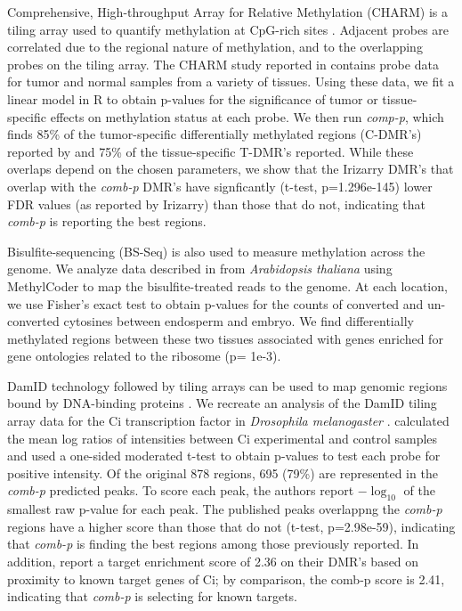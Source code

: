 \documentclass{bioinfo}
\begin{document}
\begin{methods}
Comprehensive, High-throughput Array for Relative Methylation (CHARM)
is a tiling array used to quantify methylation at CpG-rich sites
\citep{Irizarry2008}.  Adjacent probes are correlated
due to the regional nature of methylation, and to the overlapping
probes on the tiling array.  The CHARM study reported in
\cite{Irizarry2009} contains probe data for tumor and normal samples
from a variety of tissues. Using these data, we fit a linear model in R
\citep{R} to
obtain p-values for the significance of tumor or tissue-specific
effects on methylation status at each probe.  We then run
\textit{comp-p}, which finds 85\% of the tumor-specific differentially
methylated regions (C-DMR's) reported by \cite{Irizarry2009} and 75\% of
the tissue-specific T-DMR's reported.  While these overlaps depend on
the chosen parameters, we show that the Irizarry DMR's that overlap
with the \textit{comb-p} DMR's have signficantly (t-test,
p=1.296e-145) lower FDR values (as reported by Irizarry) than those
that do not, indicating that \textit{comb-p} is reporting the best regions.

Bisulfite-sequencing (BS-Seq) is also used to measure methylation across the
genome.  We analyze data described in \cite{Hsieh2009} from {\it Arabidopsis
thaliana} using MethylCoder \citep{Pedersen2011} to map the
bisulfite-treated reads to the genome. At each location,
we use Fisher's exact test to obtain p-values for the counts of
converted and un-converted cytosines between endosperm and embryo. We find
differentially methylated regions between these two tissues associated
with genes enriched for gene ontologies related to the ribosome (p=
1e-3).

DamID technology followed by tiling arrays can be used to map genomic
regions bound by DNA-binding proteins \citep{Steensel2001}.  We
recreate an analysis of the DamID tiling array data for the Ci
transcription factor in {\it Drosophila melanogaster} \citep{Biehs}.
\cite{Kechris2010} calculated the
mean log ratios of intensities between Ci experimental and control
samples and used a one-sided moderated t-test \citep{Limma2005} to obtain
p-values to test each probe for positive intensity.
Of the original 878 regions, 695 (79\%) are
represented in the \textit{comb-p} predicted peaks.  To score each
peak, the authors report $-\log_{10}$ of the smallest raw p-value for
each peak. The published peaks overlappng the \textit{comb-p} regions
have a higher score than those that do not (t-test, p=2.98e-59),
indicating that \textit{comb-p}
is finding the best regions among those previously reported.
In addition,
\cite{Kechris2010} report a target enrichment score of 2.36 on their DMR's
based on proximity to known target genes of Ci; by comparison, the
comb-p score is 2.41, indicating that \textit{comb-p} is
selecting for known targets.

\end{methods}
\end{document}

